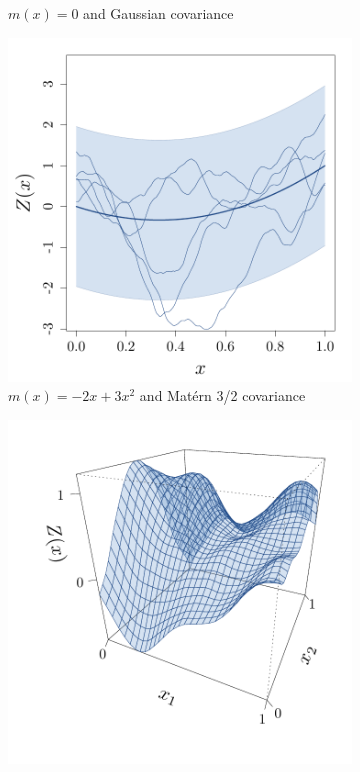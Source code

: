 \documentclass[twoside,openright]{report}
\begin{document}
\begin{figure}
\begin{subfigure}[t]{0.34\textwidth}
                \caption{$m(x) = 0$ and Gaussian covariance}
                \label{fig:GPsampleb}
        \end{subfigure}
        \begin{subfigure}[t]{0.34\textwidth}
                \includegraphics[width=\textwidth]{figures/ch1_GPpath3}
                \caption{$m(x) = -2x + 3x^2$ and Mat\'ern 3/2 covariance}
        \end{subfigure}%
        \hspace{1cm}       
        \begin{subfigure}[t]{0.34\textwidth}
                \includegraphics[width=\textwidth]{figures/ch1_GPpath4}

\end{subfigure}
\end{figure}
\end{document}
